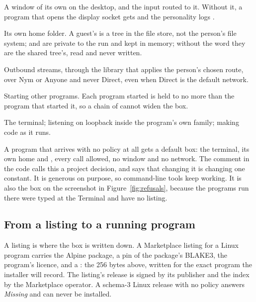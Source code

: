 \begin{description}[leftmargin=0pt,style=unboxed,font=\normalfont\code,itemsep=0.3em]
\item[WAYLAND] A window of its own on the desktop, and the input routed to it. Without it, a program that opens the display socket gets  and the personality logs .
\item[FILES\_HOME] Its own home folder. A guest's \code{/} is a tree in the file store, not the person's file system;  and  are private to the run and kept in memory; without the word they are the shared tree's, read and never written.
\item[NET\_ANON] Outbound streams, through the library that applies the person's chosen route, over Nym or Anyone and never Direct, even when Direct is the default network.
\item[EXEC] Starting other programs. Each program started is held to no more than the program that started it, so a chain of  cannot widen the box.
\item[TTY, NET\_LISTEN\_LO, JIT] The terminal; listening on loopback inside the program's own family; making code as it runs.
\end{description}

A program that arrives with no policy at all gets a default box: the terminal, its own home and , every call allowed, no window and no network. The comment in the code calls this a project decision, and says that changing it is changing one constant. It is generous on purpose, so command-line tools keep working. It is also the box on the screenshot in Figure~\ref{fig:refusals}, because the programs run there were typed at the Terminal and have no listing.

\subsection{From a listing to a running program}

A listing is where the box is written down. A Marketplace listing for a Linux program carries the Alpine package, a pin of the package's BLAKE3, the program's licence, and a : the 256 bytes above, written for the exact program the installer will record. The listing's release is signed by its publisher and the index by the Marketplace operator. A schema-3 Linux release with no policy answers \emph{Missing} and can never be installed.


